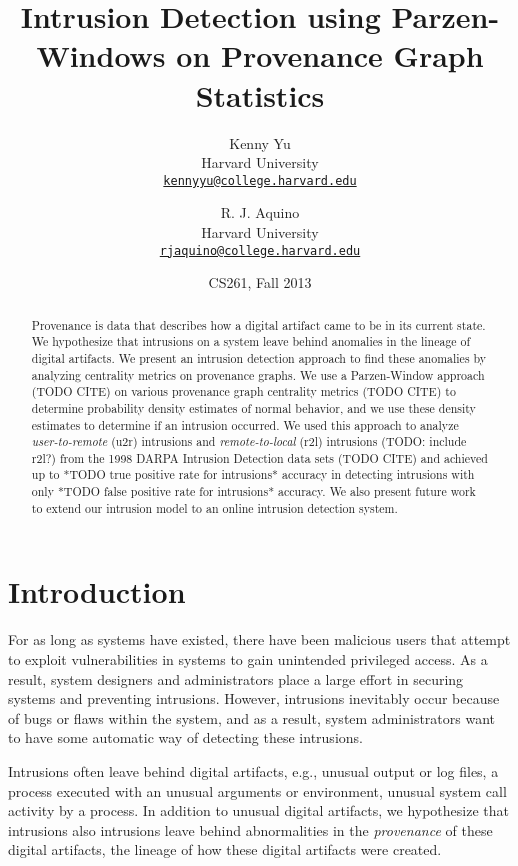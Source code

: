 \documentclass[10pt,twocolumn]{article}
\title{{\bf Intrusion Detection using Parzen-Windows on Provenance Graph Statistics}}
\author{
    Kenny Yu\\
    Harvard University\\
    \href{mailto:kennyyu@college.harvard.edu}{\texttt{kennyyu@college.harvard.edu}}
  \and
    R. J. Aquino\\
    Harvard University\\
    \href{mailto:rjaquino@college.harvard.edu}{\texttt{rjaquino@college.harvard.edu}}
}
\date{CS261, Fall 2013}
\begin{document}
\maketitle

%

\begin{abstract}
Provenance is data that describes how a digital artifact came to be in its current state. We hypothesize
that intrusions on a system leave behind anomalies in the lineage of digital artifacts.
We present an intrusion detection approach to find these anomalies by analyzing centrality metrics
on provenance graphs. We use a Parzen-Window approach (TODO CITE) on various provenance graph centrality metrics (TODO CITE)
to determine probability density estimates of normal behavior, and we use these density estimates to 
determine if an intrusion occurred. We used this approach to analyze {\em user-to-remote} (u2r) intrusions and 
{\em remote-to-local} (r2l) intrusions (TODO: include r2l?) from the 1998 DARPA Intrusion Detection data sets (TODO CITE) and 
achieved up to *TODO true positive rate for intrusions* accuracy in detecting
intrusions with only *TODO false positive rate for intrusions* accuracy. We also present future work
to extend our intrusion model to an online intrusion detection system.

\end{abstract}

%

\section{Introduction}

For as long as systems have existed, there have been malicious users that attempt to exploit vulnerabilities
in systems to gain unintended privileged access. As a result, system designers and 
administrators place a large effort in securing systems and preventing intrusions. However, intrusions
inevitably occur because of bugs or flaws within the system, and as a result, system administrators want to
have some automatic way of detecting these intrusions. 

Intrusions often leave behind digital artifacts, e.g., unusual output or log files, a process executed
with an unusual arguments or environment, unusual system call activity by a process. In addition to
unusual digital artifacts, we hypothesize that
intrusions also intrusions leave behind abnormalities
in the {\em provenance} of these digital artifacts, the lineage of how these digital artifacts were created.
\end{document}
